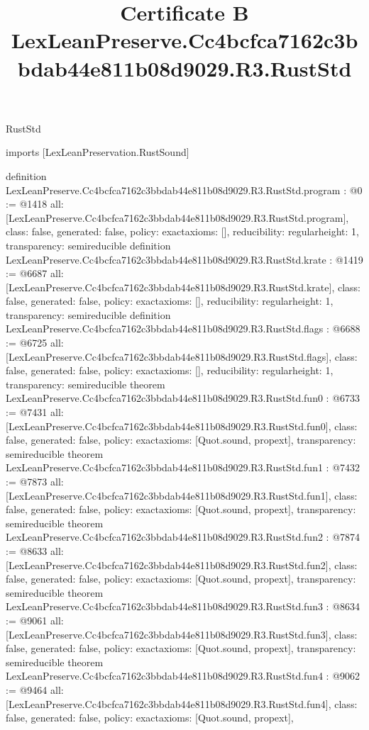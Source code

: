 \begin{lexlean}{RustStd}
\title{Certificate B LexLeanPreserve.Cc4bcfca7162c3bbdab44e811b08d9029.R3.RustStd}
\begin{coremodule}
imports [LexLeanPreservation.RustSound]

definition LexLeanPreserve.Cc4bcfca7162c3bbdab44e811b08d9029.R3.RustStd.program : @0 := @1418 {
  all: [LexLeanPreserve.Cc4bcfca7162c3bbdab44e811b08d9029.R3.RustStd.program],
  class: false,
  generated: false,
  policy: exact{axioms: []},
  reducibility: regular{height: 1},
  transparency: semireducible
}
definition LexLeanPreserve.Cc4bcfca7162c3bbdab44e811b08d9029.R3.RustStd.krate : @1419 := @6687 {
  all: [LexLeanPreserve.Cc4bcfca7162c3bbdab44e811b08d9029.R3.RustStd.krate],
  class: false,
  generated: false,
  policy: exact{axioms: []},
  reducibility: regular{height: 1},
  transparency: semireducible
}
definition LexLeanPreserve.Cc4bcfca7162c3bbdab44e811b08d9029.R3.RustStd.flags : @6688 := @6725 {
  all: [LexLeanPreserve.Cc4bcfca7162c3bbdab44e811b08d9029.R3.RustStd.flags],
  class: false,
  generated: false,
  policy: exact{axioms: []},
  reducibility: regular{height: 1},
  transparency: semireducible
}
theorem LexLeanPreserve.Cc4bcfca7162c3bbdab44e811b08d9029.R3.RustStd.fun0 : @6733 := @7431 {
  all: [LexLeanPreserve.Cc4bcfca7162c3bbdab44e811b08d9029.R3.RustStd.fun0],
  class: false,
  generated: false,
  policy: exact{axioms: [Quot.sound, propext]},
  transparency: semireducible
}
theorem LexLeanPreserve.Cc4bcfca7162c3bbdab44e811b08d9029.R3.RustStd.fun1 : @7432 := @7873 {
  all: [LexLeanPreserve.Cc4bcfca7162c3bbdab44e811b08d9029.R3.RustStd.fun1],
  class: false,
  generated: false,
  policy: exact{axioms: [Quot.sound, propext]},
  transparency: semireducible
}
theorem LexLeanPreserve.Cc4bcfca7162c3bbdab44e811b08d9029.R3.RustStd.fun2 : @7874 := @8633 {
  all: [LexLeanPreserve.Cc4bcfca7162c3bbdab44e811b08d9029.R3.RustStd.fun2],
  class: false,
  generated: false,
  policy: exact{axioms: [Quot.sound, propext]},
  transparency: semireducible
}
theorem LexLeanPreserve.Cc4bcfca7162c3bbdab44e811b08d9029.R3.RustStd.fun3 : @8634 := @9061 {
  all: [LexLeanPreserve.Cc4bcfca7162c3bbdab44e811b08d9029.R3.RustStd.fun3],
  class: false,
  generated: false,
  policy: exact{axioms: [Quot.sound, propext]},
  transparency: semireducible
}
theorem LexLeanPreserve.Cc4bcfca7162c3bbdab44e811b08d9029.R3.RustStd.fun4 : @9062 := @9464 {
  all: [LexLeanPreserve.Cc4bcfca7162c3bbdab44e811b08d9029.R3.RustStd.fun4],
  class: false,
  generated: false,
  policy: exact{axioms: [Quot.sound, propext]},
}
\end{coremodule}
\end{lexlean}
